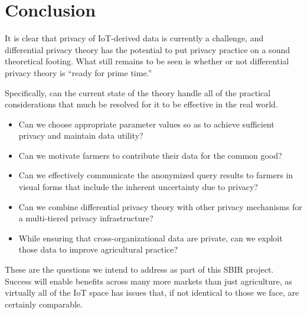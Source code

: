 \section{Conclusion}
\label{sec:conclude}

It is clear that privacy of IoT-derived data is currently a challenge,
and differential privacy theory has the potential to put privacy practice
on a sound theoretical footing.  What still remains to be seen is whether
or not differential privacy theory is ``ready for prime time.''

Specifically, can the current state of the theory handle all of the
practical considerations that much be resolved for it to be effective
in the real world.
\begin{itemize}
\item Can we choose appropriate parameter values so as to achieve
sufficient privacy and maintain data utility?
\item Can we motivate farmers to contribute their data for the common good?
\item Can we effectively communicate the anonymized query results to
farmers in visual forms that include the inherent uncertainty due to privacy?
\item Can we combine differential privacy theory with other privacy
mechanisms for a multi-tiered privacy infrastructure?
\item While ensuring that cross-organizational data are private, can we
exploit those data to improve agricultural practice?
\end{itemize}
These are the questions we intend to address as part of this SBIR project.
Success will enable benefits across many more markets than just agriculture,
as virtually all of the IoT space has issues that, if not identical to
those we face, are certainly comparable.

